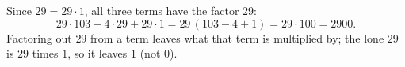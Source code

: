 Since $29=29\cdot1$, all three terms have the factor $29$:
\[
29\cdot103-4\cdot29+29\cdot1=29\,(103-4+1)=29\cdot100=\boxed{2900}.
\]
Factoring out $29$ from a term leaves what that term is multiplied by; the lone $29$ is $29$ times $1$, so it leaves $1$ (not $0$).
